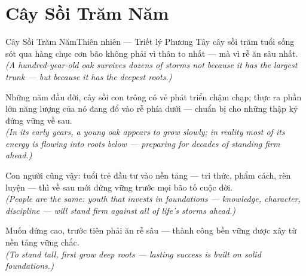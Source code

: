 \section{Cây Sồi Trăm Năm}
\begin{truyen}{Cây Sồi Trăm Năm}{Thiên nhiên --- Triết lý Phương Tây}
 cây sồi trăm tuổi sống sót qua hàng chục cơn bão không phải vì thân to nhất --- mà vì rễ ăn sâu nhất.\\[4pt]
\textit{(A hundred-year-old oak survives dozens of storms not because it has the largest trunk --- but because it has the deepest roots.)}

Những năm đầu đời, cây sồi con trông có vẻ phát triển chậm chạp; thực ra phần lớn năng lượng của nó đang đổ vào rễ phía dưới --- chuẩn bị cho những thập kỷ đứng vững về sau.\\[4pt]
\textit{(In its early years, a young oak appears to grow slowly; in reality most of its energy is flowing into roots below --- preparing for decades of standing firm ahead.)}

Con người cũng vậy: tuổi trẻ đầu tư vào nền tảng --- tri thức, phẩm cách, rèn luyện --- thì về sau mới đứng vững trước mọi bão tố cuộc đời.\\[4pt]
\textit{(People are the same: youth that invests in foundations --- knowledge, character, discipline --- will stand firm against all of life's storms ahead.)}

\end{truyen}
\begin{baihoc}
  Muốn đứng cao, trước tiên phải ăn rễ sâu --- thành công bền vững được xây từ nền tảng vững chắc.\\[4pt]
  \textit{(To stand tall, first grow deep roots --- lasting success is built on solid foundations.)}
\end{baihoc}

